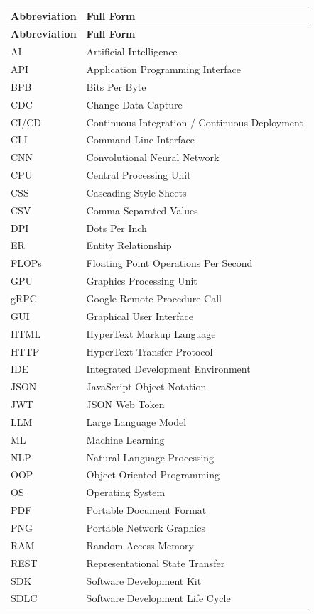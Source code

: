 \begin{longtable}{p{3cm} p{10cm}}
\textbf{Abbreviation} & \textbf{Full Form} \\
\midrule
\endfirsthead
\textbf{Abbreviation} & \textbf{Full Form} \\
\midrule
\endhead
AI & Artificial Intelligence \\
API & Application Programming Interface \\
BPB & Bits Per Byte \\
CDC & Change Data Capture \\
CI/CD & Continuous Integration / Continuous Deployment \\
CLI & Command Line Interface \\
CNN & Convolutional Neural Network \\
CPU & Central Processing Unit \\
CSS & Cascading Style Sheets \\
CSV & Comma-Separated Values \\
DPI & Dots Per Inch \\
ER & Entity Relationship \\
FLOPs & Floating Point Operations Per Second \\
GPU & Graphics Processing Unit \\
gRPC & Google Remote Procedure Call \\
GUI & Graphical User Interface \\
HTML & HyperText Markup Language \\
HTTP & HyperText Transfer Protocol \\
IDE & Integrated Development Environment \\
JSON & JavaScript Object Notation \\
JWT & JSON Web Token \\
LLM & Large Language Model \\
ML & Machine Learning \\
NLP & Natural Language Processing \\
OOP & Object-Oriented Programming \\
OS & Operating System \\
PDF & Portable Document Format \\
PNG & Portable Network Graphics \\
RAM & Random Access Memory \\
REST & Representational State Transfer \\
SDK & Software Development Kit \\
SDLC & Software Development Life Cycle \\

\end{longtable}
